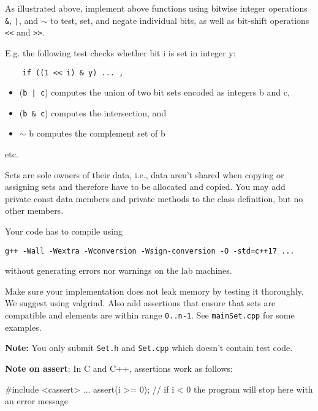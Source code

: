 \documentclass[a4paper,11pt]{article}
\begin{document}
\medskip 

As illustrated above, implement above functions using bitwise integer
operations \texttt{\&}, \texttt{|}, and $\mathtt{\sim}$ to test, set, and negate individual bits, as well
as bit-shift operations \texttt{<<} and \texttt{>>}.

\medskip 

E.g. the following test checks whether bit i is set in integer y:
\begin{verbatim}
    if ((1 << i) & y) ... ,
\end{verbatim}
\begin{itemize}
    \item (\texttt{b | c}) computes the union of two bit sets encoded as integers b and c,
    \item (\texttt{b \& c}) computes the intersection, and 
    \item $\mathtt{\sim}$ b computes the complement set of b
\end{itemize}
etc.

\medskip 

Sets are sole owners of their data, i.e., data aren't shared when copying or
assigning sets and therefore have to be allocated and copied.
You may add private const data members and private methods to the class
definition, but no other members.

Your code has to compile using
\begin{center}
    \texttt{g++ -Wall -Wextra -Wconversion -Wsign-conversion -O -std=c++17 ...}
\end{center}
without generating errors nor warnings on the lab machines.

\medskip 

Make sure your implementation does not leak memory by testing it
thoroughly. We suggest using valgrind. Also add assertions that ensure that
sets are compatible and elements are within range \texttt{0..n-1}. See \texttt{mainSet.cpp} for
some examples.

\medskip

\textbf{Note:} You only submit \texttt{Set.h} and \texttt{Set.cpp} which doesn't contain test code.

\medskip

\textbf{Note on assert}: In C and C++, assertions work as follows:

\begin{cppcode}
#include <cassert>
...
assert(i >= 0);   // if i < 0 the program will stop here with an error message
\end{cppcode}
\end{document}
